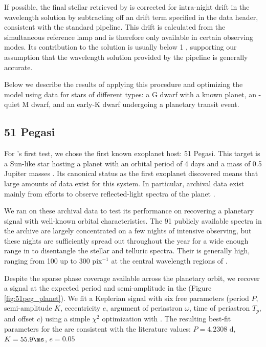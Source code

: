 \documentclass[modern]{aastex62}
\begin{document}
If possible, the final stellar \RV retrieved by \wobble is corrected for intra-night drift in the wavelength solution by subtracting off an \RV drift term specified in the data header, consistent with the standard \HARPS pipeline. 
This drift is calculated from the simultaneous reference lamp and is therefore only available in certain observing modes. 
Its contribution to the \RV solution is usually below 1 \ms, supporting our assumption that the wavelength solution provided by the \HARPS pipeline is generally accurate.

Below we describe the results of applying this procedure and optimizing the \wobble model using \HARPS data for stars of different types: a G dwarf with a known planet, an \RV-quiet M dwarf, and an early-K dwarf undergoing a planetary transit event.

\subsection{51 Pegasi}

For \wobble's first test, we chose the first known exoplanet host: 51 Pegasi. 
This target is a Sun-like star hosting a planet with an orbital period of 4 days and a mass of 0.5 Jupiter masses \citep{Mayor1995}. 
Its canonical status as the first exoplanet discovered means that large amounts of data exist for this system. 
In particular, archival \HARPS data exist mainly from efforts to observe reflected-light spectra of the planet \citep{Martins2015}. 

We ran \wobble on these archival data to test its performance on recovering a planetary signal with well-known orbital characteristics.
The 91 publicly available spectra in the \HARPS archive are largely concentrated on a few nights of intensive observing, but these nights are sufficiently spread out throughout the year for a wide enough range in \BERV to disentangle the stellar and telluric spectra. 
Their \SNR is generally high, ranging from 100 up to 300 pix$^{-1}$ at the central wavelength regions of \HARPS.

Despite the sparse phase coverage available across the planetary orbit, we recover a signal at the expected period and semi-amplitude in the \RVs (Figure \ref{fig:51peg_planet}). 
We fit a Keplerian signal with six free parameters (period $P$, \RV semi-amplitude $K$, eccentricity $e$, argument of periastron $\omega$, time of periastron $T_p$, and \RV offset $c$) using a simple $\chi^2$ optimization with . 
The resulting best-fit parameters for the \wobble \RVs are consistent with the literature values: $P = 4.2308$ d, $K = 55.9 \ms$, $e = 0.05$
\end{document}
